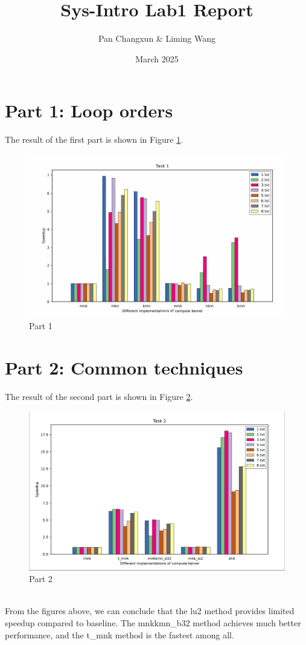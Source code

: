 \documentclass[]{article}
\title{\textbf{Sys-Intro Lab1 Report}}
\author{Pan Changxun \& Liming Wang}
\date{March 2025}
\begin{document}
\maketitle

\section*{Part 1: Loop orders}
The result of the first part is shown in Figure \ref{fig:part1}.
\begin{figure}[h]
		\centering
		\includegraphics[width=1.0\textwidth]{task1.png}
		\caption{Part 1}
		\label{fig:part1}
\end{figure}

\newpage
\section*{Part 2: Common techniques}
The result of the second part is shown in Figure \ref{fig:part2}.
\begin{figure}[h]
		\centering
		\includegraphics[width=1.0\textwidth]{task2.png}
		\caption{Part 2}
		\label{fig:part2}
\end{figure}
\\
From the figures above, we can conclude that the lu2 method provides limited speedup compared to baseline. The mnkkmn\_b32 method achieves much better performance, and the t\_mnk method is the fastest among all.
\end{document}
